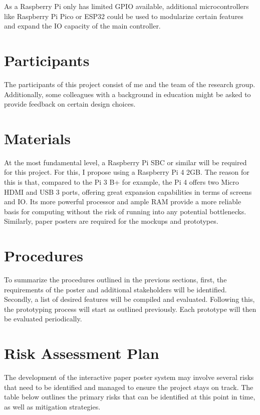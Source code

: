 As a Raspberry Pi only has limited GPIO available, additional microcontrollers like Raspberry Pi Pico or ESP32 could be used to modularize certain features and expand the IO capacity of the main controller.

\section{Participants}
The participants of this project consist of me and the team of the research group. Additionally, some colleagues with a background in education might be asked to provide feedback on certain design choices.

\section{Materials}
At the most fundamental level, a Raspberry Pi SBC or similar will be required for this project. For this, I propose using a Raspberry Pi 4 2GB. The reason for this is that, compared to the Pi 3 B+ for example, the Pi 4 offers two Micro HDMI and USB 3 ports, offering great expansion capabilities in terms of screens and IO. Its more powerful processor and ample RAM provide a more reliable basis for computing without the risk of running into any potential bottlenecks.
Similarly, paper posters are required for the mockups and prototypes.

\section{Procedures}
To summarize the procedures outlined in the previous sections, first, the requirements of the poster and additional stakeholders will be identified. Secondly, a list of desired features will be compiled and evaluated. Following this, the prototyping process will start as outlined previously. Each prototype will then be evaluated periodically.

\section{Risk Assessment Plan}

The development of the interactive paper poster system may involve several risks that need to be identified and managed to ensure the project stays on track. The table below outlines the primary risks that can be identified at this point in time, as well as mitigation strategies.


